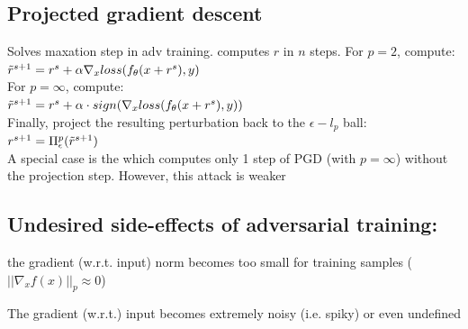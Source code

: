 \subsection*{Projected gradient descent} Solves maxation step in adv training.  computes $r$ in $n$ steps. For $p = 2$, compute:\\
$\Tilde{r}^{s+1} = r^s + \alpha \nabla_x loss(f_\theta(x + r^s), y)$\\
For $p = \infty$, compute: \\
$\Tilde{r}^{s+1} = r^s + \alpha \cdot sign(\nabla_x loss(f_\theta(x + r^s), y))$\\
Finally, project the resulting perturbation back to the $\epsilon - l_p$ ball:
$r^{s+1} = \Pi_\epsilon^p(\Tilde{r}^{s+1})$\\
A special case is the  which computes only 1 step of PGD (with $p = \infty$) without the projection step. However, this attack is weaker

\subsection*{Undesired side-effects of adversarial training:}
\begin{inparaitem}[$\color{mygreen} \triangleright$]
\item {} the gradient (w.r.t. input) norm becomes too small for training samples ($||\nabla_xf(x)||_p \approx 0$)\\
\item {} The gradient (w.r.t.) input becomes extremely noisy (i.e. spiky) or even undefined
\end{inparaitem}
